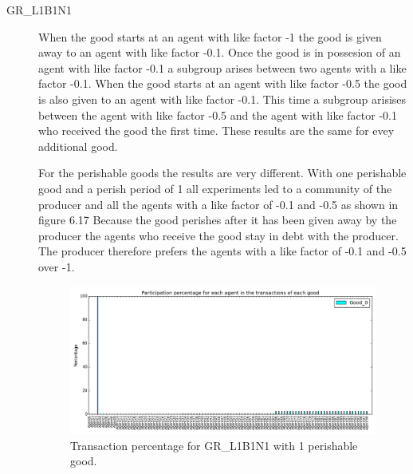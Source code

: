 \documentclass[twoside,openright]{uva-bachelor-thesis}
\begin{document}
\begin{description}
\item[GR\_L1B1N1] When the good starts at an agent with like factor -1 the good is given away to an agent with like factor -0.1. Once the good is in possesion of an agent with like factor -0.1 a subgroup arises between two agents with a like factor -0.1. When the good starts at an agent with like factor -0.5 the good is also given to an agent with like factor -0.1. This time a subgroup arisises between the agent with like factor -0.5 and the agent with like factor -0.1 who received the good the first time. These results are the same for evey additional good.

For the perishable goods the results are very different. With one perishable good and a perish period of 1 all experiments led to a community of the producer and all the agents with a like factor of -0.1 and -0.5 as shown in figure 6.17 Because the good perishes after it has been given away by the producer the agents who receive the good stay in debt with the producer. The producer therefore prefers the agents with a like factor of -0.1 and -0.5 over -1. \\
\begin{figure}[h!]
  \centering
   \includegraphics[scale=0.4]{Simulation_figures/GR_L1B1N1/1perishable_1-1_15k}
  \caption{Transaction percentage for GR\_L1B1N1 with 1 perishable good.}
\end{figure}


\end{description}
\end{document}
